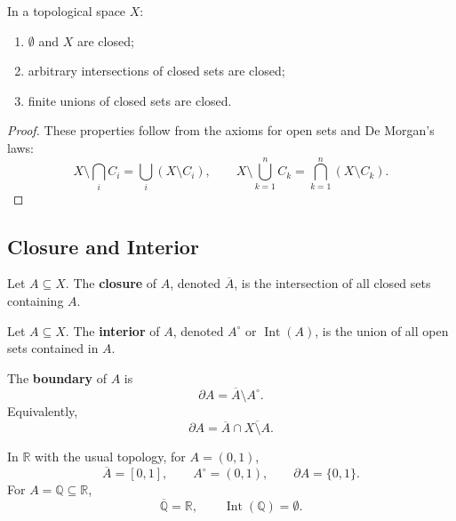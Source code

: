 \begin{proposition}
In a topological space $X$:
\begin{enumerate}
    \item $\emptyset$ and $X$ are closed;
    \item arbitrary intersections of closed sets are closed;
    \item finite unions of closed sets are closed.
\end{enumerate}
\end{proposition}

\begin{proof}
These properties follow from the axioms for open sets and De Morgan's laws:
\[
    X\setminus\bigcap_i C_i=\bigcup_i(X\setminus C_i),
    \qquad
    X\setminus\bigcup_{k=1}^n C_k=\bigcap_{k=1}^n(X\setminus C_k).
\]
\end{proof}

\subsection{Closure and Interior}

\begin{definition}[Closure]
Let $A\subseteq X$. The \textbf{closure} of $A$, denoted $\overline{A}$, is the intersection of all closed sets containing $A$.
\end{definition}

\begin{definition}[Interior]
Let $A\subseteq X$. The \textbf{interior} of $A$, denoted $A^\circ$ or $\operatorname{Int}(A)$, is the union of all open sets contained in $A$.
\end{definition}

\begin{definition}[Boundary]
The \textbf{boundary} of $A$ is
\[
    \partial A=\overline{A}\setminus A^\circ.
\]
Equivalently,
\[
    \partial A=\overline{A}\cap\overline{X\setminus A}.
\]
\end{definition}

\newpage

\begin{example}
In $\mathbb{R}$ with the usual topology, for $A=(0,1)$,
\[
    \overline{A}=[0,1],
    \qquad
    A^\circ=(0,1),
    \qquad
    \partial A=\{0,1\}.
\]
For $A=\mathbb{Q}\subseteq\mathbb{R}$,
\[
    \overline{\mathbb{Q}}=\mathbb{R},
    \qquad
    \operatorname{Int}(\mathbb{Q})=\emptyset.
\]
\end{example}

